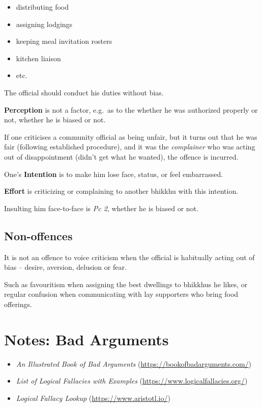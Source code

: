\begin{itemize}
\tightlist
\item
  distributing food
\item
  assigning lodgings
\item
  keeping meal invitation rosters
\item
  kitchen liaison
\item
  etc.
\end{itemize}

The official should conduct his duties without bias.

\textbf{Perception} is not a factor, e.g.~as to the whether he was
authorized properly or not, whether he is biased or not.

\clearpage

If one criticises a community official as being unfair, but it turns out
that he was fair (following established procedure), and it was the
\emph{complainer} who was acting out of disappointment (didn't get what
he wanted), the offence is incurred.

One's \textbf{Intention} is to make him lose face, status, or feel
embarrassed.

\textbf{Effort} is criticizing or complaining to another bhikkhu with
this intention.

Insulting him face-to-face is \emph{Pc 2}, whether he is biased or not.

\subsection{Non-offences}

It is not an offence to voice criticism when the official is habitually
acting out of bias -- desire, aversion, delusion or fear.

Such as favouritism when assigning the best dwellings to bhikkhus he
likes, or regular confusion when communicating with lay supporters who
bring food offerings.

\bigskip

\section{Notes: Bad Arguments}

\bigskip

\begin{itemize}
\tightlist
\item
  \emph{An Illustrated Book of Bad Arguments}
  (\url{https://bookofbadarguments.com/})
\item
  \emph{List of Logical Fallacies with Examples}
  (\url{https://www.logicalfallacies.org/})
\item
  \emph{Logical Fallacy Lookup} (\url{https://www.aristotl.io/})
\end{itemize}


